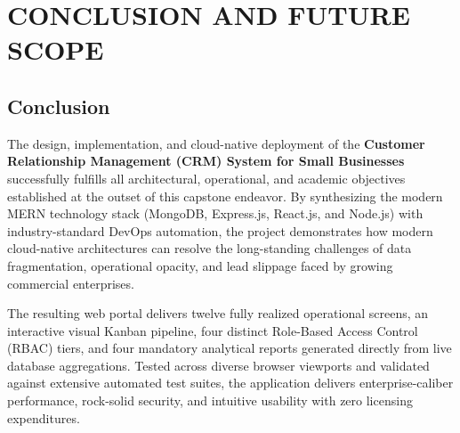 \chapter{CONCLUSION AND FUTURE SCOPE}

\section{Conclusion}
The design, implementation, and cloud-native deployment of the \textbf{Customer Relationship Management (CRM) System for Small Businesses} successfully fulfills all architectural, operational, and academic objectives established at the outset of this capstone endeavor. By synthesizing the modern MERN technology stack (MongoDB, Express.js, React.js, and Node.js) with industry-standard DevOps automation, the project demonstrates how modern cloud-native architectures can resolve the long-standing challenges of data fragmentation, operational opacity, and lead slippage faced by growing commercial enterprises.

The resulting web portal delivers twelve fully realized operational screens, an interactive visual Kanban pipeline, four distinct Role-Based Access Control (RBAC) tiers, and four mandatory analytical reports generated directly from live database aggregations. Tested across diverse browser viewports and validated against extensive automated test suites, the application delivers enterprise-caliber performance, rock-solid security, and intuitive usability with zero licensing expenditures.

